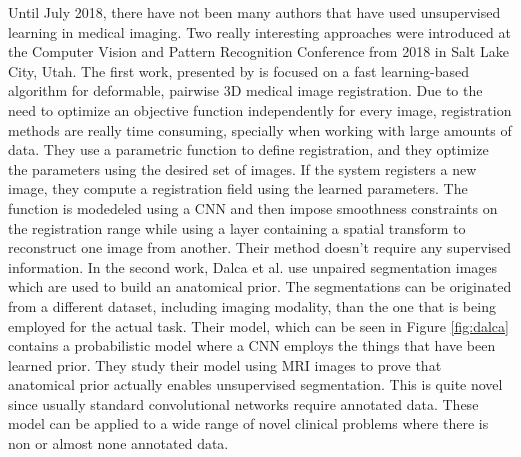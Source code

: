 \documentclass[letterpaper, 10 pt, conference]{ieeeconf}  %
\begin{document}
Until July 2018, there have not been many authors that have used unsupervised learning in medical imaging. Two really interesting approaches were introduced at the Computer Vision and Pattern Recognition Conference from 2018 in Salt Lake City, Utah. The first work, presented by \cite{Balakrishnan_2018_CVPR} is focused on a fast learning-based algorithm for deformable, pairwise 3D medical image registration. Due to the need to optimize an objective function independently for every image, registration methods are really time consuming, specially when working with large amounts of data. They use a parametric function to define registration, and they optimize the parameters using the desired set of images. If the system registers a new image, they compute a registration field using the learned parameters. The function is modedeled using a CNN and then impose smoothness constraints on the registration range while using a layer containing a spatial transform to reconstruct one image from another. Their method doesn't require any supervised information. In the second work, Dalca et al. \cite{Dalca_2018_CVPR} use unpaired segmentation images which are used to build an anatomical prior. The segmentations can be originated from a different dataset, including imaging modality, than the one that is being employed for the actual task. Their model, which can be seen in Figure \ref{fig:dalca} contains a probabilistic model where a CNN employs the things that have been learned prior. They study their model using MRI images to prove that anatomical prior actually enables unsupervised segmentation. This is quite novel since usually standard convolutional networks require annotated data. These model can be applied to a wide range of novel clinical problems where there is non or almost none annotated data.



\addtolength{\textheight}{-12cm}   %

\end{document}
